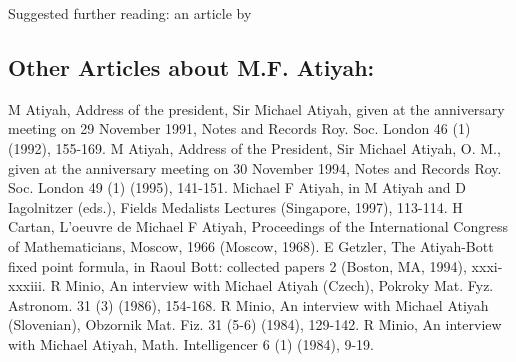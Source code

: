 \documentclass[12pt]{article}
\theoremstyle{plain}
\theoremstyle{definition}
\numberwithin{equation}{section}
\begin{document}
Suggested further reading: an article by  


\subsection{Other Articles about M.F. Atiyah:}

M Atiyah, Address of the president, Sir Michael Atiyah, given at the anniversary meeting on 29 November 1991, Notes and Records Roy. Soc. London 46 (1) (1992), 155-169. 
M Atiyah, Address of the President, Sir Michael Atiyah, O. M., given at the anniversary meeting on 30 November 1994, Notes and Records Roy. Soc. London 49 (1) (1995), 141-151. 
Michael F Atiyah, in M Atiyah and D Iagolnitzer (eds.), Fields Medalists Lectures (Singapore, 1997), 113-114. 
H Cartan, L'oeuvre de Michael F Atiyah, Proceedings of the International Congress of Mathematicians, Moscow, 1966 (Moscow, 1968). 
E Getzler, The Atiyah-Bott fixed point formula, in Raoul Bott: collected papers 2 (Boston, MA, 1994), xxxi-xxxiii. 
R Minio, An interview with Michael Atiyah (Czech), Pokroky Mat. Fyz. Astronom. 31 (3) (1986), 154-168. 
R Minio, An interview with Michael Atiyah (Slovenian), Obzornik Mat. Fiz. 31 (5-6) (1984), 129-142. 
R Minio, An interview with Michael Atiyah, Math. Intelligencer 6 (1) (1984), 9-19. 
\end{document}
